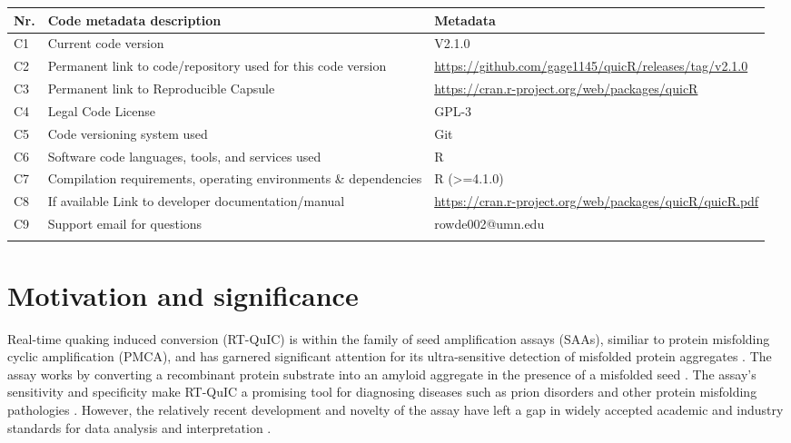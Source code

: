 \documentclass[preprint,12pt,a4paper]{elsarticle}
\begin{document}
    \begin{table}[ht]
        \fontsize{9pt}{9pt}\selectfont
        \centering
        \begin{tabular}{lp{6cm}p{6cm}}
            \hline{}
            \textbf{Nr.} & \textbf{Code metadata description} & \textbf{Metadata} \\
            \hline{}
            C1 & Current code version & V2.1.0 \\
            C2 & Permanent link to code/repository used for this code version & \url{https://github.com/gage1145/quicR/releases/tag/v2.1.0} \\
            C3  & Permanent link to Reproducible Capsule & \url{https://cran.r-project.org/web/packages/quicR}\\
            C4 & Legal Code License & GPL-3\\
            C5 & Code versioning system used & Git\\
            C6 & Software code languages, tools, and services used & R\\
            C7 & Compilation requirements, operating environments \& dependencies & R (>=4.1.0)\\
            C8 & If available Link to developer documentation/manual & \url{https://cran.r-project.org/web/packages/quicR/quicR.pdf}\\
            C9 & Support email for questions & rowde002@umn.edu\\
            \hline{}
        \end{tabular}
    \end{table}

    \section{Motivation and significance}
        Real-time quaking induced conversion (RT-QuIC) is within the family of seed amplification assays (SAAs), similiar to protein misfolding cyclic amplification (PMCA), and has garnered significant attention for its ultra-sensitive detection of misfolded protein aggregates \cite{Wilham2010, Atarashi2011}. The assay works by converting a recombinant protein substrate into an amyloid aggregate in the presence of a misfolded seed \cite{Wilham2010, Orru2012, Orru2017, Orru2015, Bongianni2019, Dassanayake2016, Hwang2018, Groveman2018, Metrick2020}. The assay's sensitivity and specificity make RT-QuIC a promising tool for diagnosing diseases such as prion disorders and other protein misfolding pathologies \cite{Fiorini2020, Franceschini2017, Picasso-Risso2022, Holz2021}. However, the relatively recent development and novelty of the assay have left a gap in widely accepted academic and industry standards for data analysis and interpretation \cite{Rowden2023}.
\end{document}
